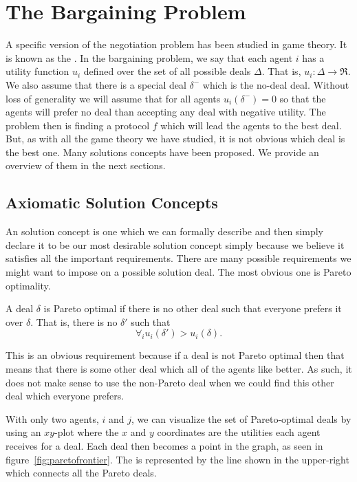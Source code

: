 \section{The Bargaining Problem}

A specific version of the negotiation problem has been studied in game
theory. It is known as the  \cite{nash50a}.  In
the bargaining problem, we say that each agent $i$ has a utility
function $u_i$ defined over the set of all possible deals $\Delta$.
That is, $u_i: \Delta \rightarrow \Re$. We also assume that there is a
special deal $\delta^-$ which is the no-deal deal.  Without loss of
generality we will assume that for all agents $u_i(\delta^-) = 0$ so
that the agents will prefer no deal than accepting any deal with
negative utility. The problem then is finding a protocol $f$ which
will lead the agents to the best deal.   But, as with all the game theory we have studied,
it is not obvious which deal is the best one. Many solutions concepts
have been proposed. We provide an overview of them in the next sections.

\subsection{Axiomatic Solution Concepts}
\label{sec:axiom-solut-conc}

An  solution concept is one which we can formally
describe and then simply declare it to be our most desirable solution
concept simply because we believe it satisfies all the important
requirements. There are many possible requirements we might want to
impose on a possible solution deal. The most obvious one is Pareto
optimality.

\begin{definition}
  \label{def:pareto-optimal}
  A deal $\delta$ is Pareto optimal if there is no other deal such
  that everyone prefers it over $\delta$. That is, there is no
  $\delta'$ such that \[\forall_i u_i(\delta') > u_i(\delta).\]
\end{definition}
This is an obvious requirement because if a deal is not Pareto optimal
then that means that there is some other deal which all of the agents
like better. As such, it does not make sense to use the non-Pareto
deal when we could find this other deal which everyone prefers.

With only two agents, $i$ and $j$, we can visualize the set of
Pareto-optimal deals by using an $xy$-plot where the $x$ and $y$
coordinates are the utilities each agent receives for a deal. Each
deal then becomes a point in the graph, as seen in
figure~\ref{fig:paretofrontier}.  The  is
represented by the line shown in the upper-right which connects all
the Pareto deals.

